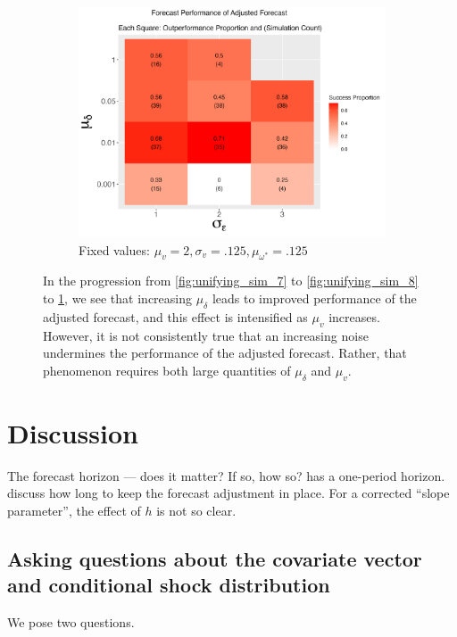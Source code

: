 \documentclass{uiucthesis2021}
\theoremstyle{definition}
\begin{document}
\begin{figure}[!h]
      \begin{subfigure}{.44\linewidth} 
        \centering
          \includegraphics[scale=.42]{simulation_plots/Nov27_160348_2024_mudelta_sigmaepsilon.png}
          \caption{Fixed values: $\mu_{v} = 2, \sigma_{v} = .125, \mu_{\omega^{*}} = .125$}\label{fig:unifying_sim_9}
      \end{subfigure}
      
          \caption{In the progression from \ref{fig:unifying_sim_7} to \ref{fig:unifying_sim_8} to \ref{fig:unifying_sim_9}, we see that increasing $\mu_{\delta}$ leads to improved performance of the adjusted forecast, and this effect is intensified as $\mu_{v}$ increases.  However, it is not consistently true that an increasing noise undermines the performance of the adjusted forecast.  Rather, that phenomenon requires both large quantities of $\mu_{\delta}$ and $\mu_{v}$.}
          \label{fig:unifying_set_of_three_three}
        \end{figure}
  \clearpage 

\section{Discussion}

The forecast horizon --- does it matter?  If so, how so?  \cite{lin2021minimizing} has a one-period horizon.  \cite[p. 203]{clements1998forecasting} discuss how long to keep the forecast adjustment in place.  For a corrected ``slope parameter'', the effect of $h$ is not so clear.\\

\subsection{Asking questions about the covariate vector and conditional shock distribution}
We pose two questions.  
\end{document}
